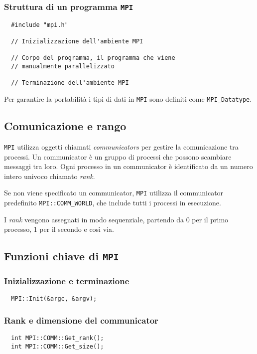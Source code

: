 \subsubsection{Struttura di un programma \texttt{MPI}}
\begin{lstlisting}
  #include "mpi.h"

  // Inizializzazione dell'ambiente MPI

  // Corpo del programma, il programma che viene 
  // manualmente parallelizzato

  // Terminazione dell'ambiente MPI
\end{lstlisting}
Per garantire la portabilità i tipi di dati in \texttt{MPI} sono definiti
come \texttt{MPI\_Datatype}.

\subsection{Comunicazione e rango}
\texttt{MPI} utilizza oggetti chiamati \textit{communicators} per gestire la
comunicazione tra processi. Un communicator è un gruppo di processi che possono
scambiare messaggi tra loro. Ogni processo in un communicator è identificato
da un numero intero univoco chiamato \textit{rank}.

Se non viene specificato un communicator, \texttt{MPI} utilizza il communicator
predefinito \texttt{MPI::COMM\_WORLD}, che include tutti i processi in esecuzione.

I \textit{rank} vengono assegnati in modo sequenziale, partendo da 0 per il
primo processo, 1 per il secondo e così via. 

\subsection{Funzioni chiave di \texttt{MPI}}

\subsubsection{Inizializzazione e terminazione}
\begin{lstlisting}
  MPI::Init(&argc, &argv);
\end{lstlisting}

\subsubsection{Rank e dimensione del communicator}
\begin{lstlisting}
  int MPI::COMM::Get_rank();
  int MPI::COMM::Get_size();
\end{lstlisting}

